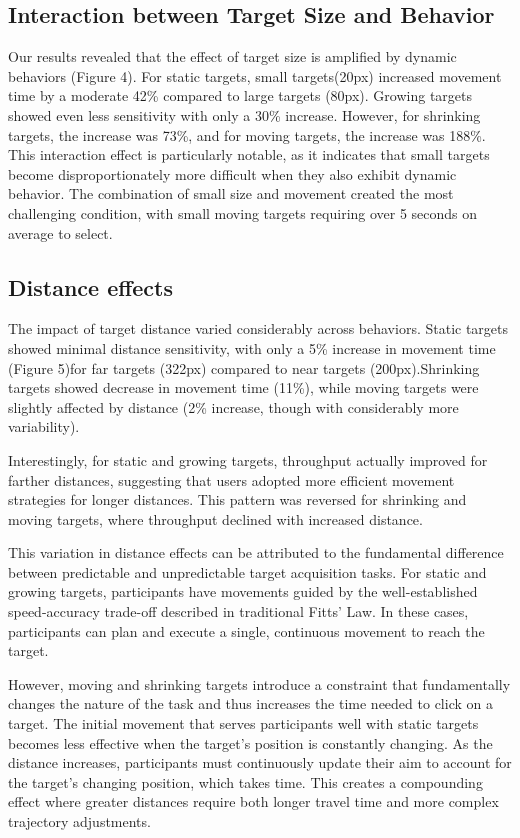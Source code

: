 \documentclass[acmlarge]{acmart}
\begin{document}
\subsection{Interaction between Target Size and Behavior}
Our results revealed that the effect of target size is amplified by dynamic behaviors (Figure 4). For static targets, small targets(20px) increased movement time by a moderate 42\% compared to large targets (80px). Growing targets showed even less sensitivity with only a 30\% increase. However, for shrinking targets, the increase was 73\%, and for moving targets, the increase was 188\%. This interaction effect is particularly notable, as it indicates that small targets become disproportionately more difficult when they also exhibit dynamic behavior. The combination of small size and movement created the most challenging condition, with small moving targets requiring over 5 seconds on average to select.
\subsection{Distance effects}
The impact of target distance varied considerably across behaviors. Static targets showed minimal distance sensitivity, with only a 5\% increase in movement time (Figure 5)for far targets (322px) compared to near targets (200px).Shrinking targets showed decrease in movement time (11\%), while moving targets were slightly affected by distance (2\% increase, though with considerably more variability).

Interestingly, for static and growing targets, throughput actually improved for farther distances, suggesting that users adopted more efficient movement strategies for longer distances. This pattern was reversed for shrinking and moving targets, where throughput declined with increased distance.

This variation in distance effects can be attributed to the fundamental difference between predictable and unpredictable target acquisition tasks. For static and growing targets, participants have movements guided by the well-established speed-accuracy trade-off described in traditional Fitts' Law. In these cases, participants can plan and execute a single, continuous movement to reach the target.

However, moving and shrinking targets introduce a constraint that fundamentally changes the nature of the task and thus increases the time needed to click on a target. The initial movement that serves participants well with static targets becomes less effective when the target's position is constantly changing. As the distance increases, participants must continuously update their aim to account for the target's changing position, which takes time. This creates a compounding effect where greater distances require both longer travel time and more complex trajectory adjustments.
\end{document}
